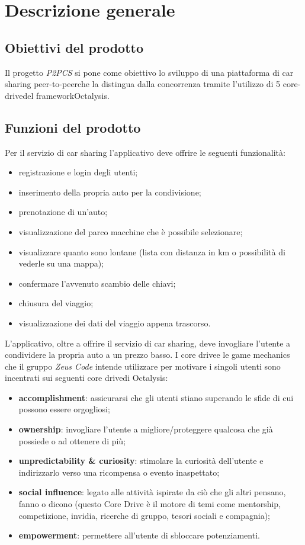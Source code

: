 \section{Descrizione generale} 
\subsection{Obiettivi del prodotto}

Il progetto \textit{P2PCS} si pone come obiettivo lo sviluppo di una piattaforma di car sharing peer-to-peer\glosp che la distingua dalla concorrenza tramite l'utilizzo di 5 core-drive\glosp del framework\glosp Octalysis\glo .

\subsection{Funzioni del prodotto}
Per il servizio di car sharing l'applicativo deve offrire le seguenti funzionalità:
\begin{itemize}
	\item registrazione e login degli utenti;
	\item inserimento della propria auto per la condivisione;
	\item prenotazione di un'auto;
	\item visualizzazione del parco macchine che è possibile selezionare;
	\item visualizzare quanto sono lontane (lista con distanza in km o possibilità di vederle su una mappa);
	\item confermare l’avvenuto scambio delle chiavi;
	\item chiusura del viaggio;
	\item visualizzazione dei dati del viaggio appena trascorso.
\end{itemize}
\newline
L'applicativo, oltre a offrire il servizio di car sharing, deve invogliare l'utente a condividere la propria auto a un prezzo basso. 
I core drive\glosp e le game mechanics che il gruppo \textit{Zeus Code} intende utilizzare per motivare i singoli utenti sono incentrati sui seguenti core drive\glosp di Octalysis\glo : 
\begin{itemize}
	\item \textbf{accomplishment}: assicurarsi che gli utenti stiano superando le sfide di cui possono essere orgogliosi;
	\item \textbf{ownership}: invogliare l'utente a migliore/proteggere qualcosa che già possiede o ad ottenere di più;
	\item \textbf{unpredictability \& curiosity}: stimolare la curiosità dell'utente e indirizzarlo verso una ricompensa o evento inaspettato;
	\item \textbf{social influence}: legato alle attività ispirate da ciò che gli altri pensano, fanno o dicono (questo Core Drive è il motore di temi come mentorship, competizione, invidia, ricerche di gruppo, tesori sociali e compagnia);
	\item \textbf{empowerment}: permettere all'utente di sbloccare potenziamenti.
\end{itemize}
